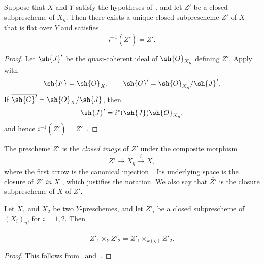 \begin{proposition}[2.8.5]
\label{IV.2.8.5}
Suppose that $X$ and $Y$ satisfy the hypotheses
of~, and let $Z'$ be a closed subprescheme of
$X_\eta$. Then there exists a unique closed subprescheme
$\overline{Z'}$ of $X$ that is flat over $Y$ and satisfies
\[
  i^{-1}(\overline{Z'})=Z'.
\]
\end{proposition}

\begin{proof}
Let $\sh{J}'$ be the quasi-coherent ideal of $\sh{O}_{X_\eta}$
defining $Z'$. Apply~ with
\[
  \sh{F}=\sh{O}_X,\qquad
  \sh{G}'=\sh{O}_{X_\eta}/\sh{J}'.
\]
If $\overline{\sh{G}'}=\sh{O}_X/\sh{J}$, then
\[
  \sh{J}'=i^*(\sh{J})\sh{O}_{X_\eta},
\]
and hence
$i^{-1}(\overline{Z'})=Z'$~.
\end{proof}

The prescheme $\overline{Z'}$ is the \emph{closed image} of $Z'$ under
the composite morphism
\[
  Z'\longrightarrow X_\eta\xrightarrow{i}X,
\]
where the first arrow is the canonical injection~.
Its underlying space is the closure of $Z'$ \emph{in} $X$
, which justifies the notation. We also say that
$\overline{Z'}$ is the closure subprescheme of $X$ of $Z'$.

\begin{corollary}[2.8.6]
\label{IV.2.8.6}
Let $X_1$ and $X_2$ be two $Y$-preschemes, and let $Z'_i$ be a closed
subprescheme of $(X_i)_\eta$, for $i=1,2$. Then
\end{corollary}

\begin{env}[2.8.6.1]
\label{IV.2.8.6.1}
\[
  \overline{Z'_1}\times_Y\overline{Z'_2}
    =
  \overline{Z'_1\times_{k(\eta)}Z'_2}.
\]
\end{env}

\begin{proof}
This follows from~ and~.
\end{proof}
